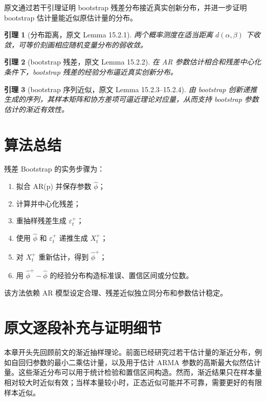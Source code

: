 \documentclass[11pt,a4paper,openany]{ctexbook}
\newtheorem{lemma}{引理}[section]
\begin{document}
原文通过若干引理证明 bootstrap 残差分布接近真实创新分布，并进一步证明 bootstrap 估计量能近似原估计量的分布。

\begin{lemma}[分布距离，原文 Lemma 15.2.1]
两个概率测度在适当距离 \(d(\alpha,\beta)\) 下收敛，可等价刻画相应随机变量分布的弱收敛。
\end{lemma}

\begin{lemma}[bootstrap 残差，原文 Lemma 15.2.2]
在 AR 参数估计相合和残差中心化条件下，bootstrap 残差的经验分布逼近真实创新分布。
\end{lemma}

\begin{lemma}[bootstrap 序列近似，原文 Lemma 15.2.3--15.2.4]
由 bootstrap 创新递推生成的序列，其样本矩阵和协方差项可逼近理论对应量，从而支持 bootstrap 参数估计的渐近有效性。
\end{lemma}

\section{算法总结}

残差 Bootstrap 的实务步骤为：
\begin{enumerate}
  \item 拟合 AR(p) 并保存参数 \(\hat\phi\)；
  \item 计算并中心化残差；
  \item 重抽样残差生成 \(\varepsilon_t^+\)；
  \item 使用 \(\hat\phi\) 和 \(\varepsilon_t^+\) 递推生成 \(X_t^+\)；
  \item 对 \(X_t^+\) 重新估计，得到 \(\hat\phi^+\)；
  \item 用 \(\hat\phi^+-\hat\phi\) 的经验分布构造标准误、置信区间或分位数。
\end{enumerate}

该方法依赖 AR 模型设定合理、残差近似独立同分布和参数估计稳定。

\section{原文逐段补充与证明细节}

本章开头先回顾前文的渐近抽样理论。前面已经研究过若干估计量的渐近分布，例如自回归参数的最小二乘估计量，以及用于估计 ARMA 参数的高斯最大似然估计量。这些渐近分布可以用于统计检验和置信区间构造。然而，渐近结果只在样本量相对较大时近似有效；当样本量较小时，正态近似可能并不可靠，需要更好的有限样本近似。
\end{document}
